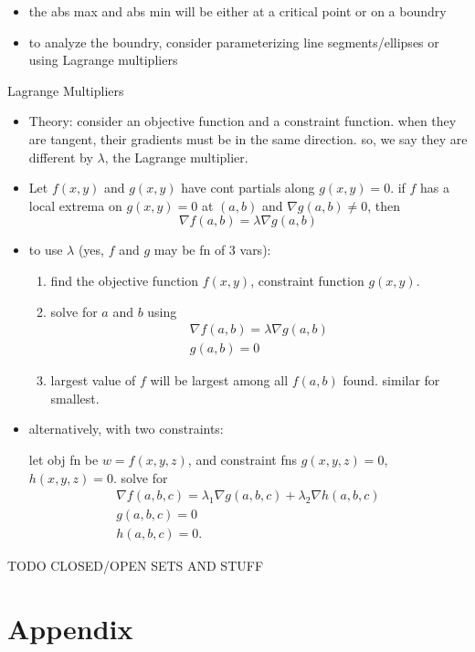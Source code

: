 \documentclass[11pt]{article}
\theoremstyle{definition}
\newcommand{\addsection}[1]{\section*{#1}\addcontentsline{toc}{section}{#1}} %
\newcommand{\col}[1]{\begin{minipage}{\columnwidth}#1\end{minipage}}
\begin{document}
\begin{multicols}{2}
{\begin{itemize}
      a cont function on a closed and bounded set has an abs min and abs max in the set
      \item the abs max and abs min will be either at a critical point or on a boundry
      \item to analyze the boundry, consider parameterizing line segments/ellipses or using Lagrange multipliers
    \end{itemize}
  }
  \col{
    Lagrange Multipliers
    \begin{itemize}
      \item Theory: consider an objective function and a constraint function. when they are tangent, their gradients must be in the same direction. so, we say they are different by $\lambda$, the Lagrange multiplier.
      \item Let $f(x,y)$ and $g(x,y)$ have cont partials along $g(x,y)=0$. if $f$ has a local extrema on $g(x,y)=0$ at $(a,b)$ and $\nabla g(a,b) \ne 0$, then
      \[ \nabla f(a,b) = \lambda \nabla g(a,b) \]
      \item to use $\lambda$ (yes, $f$ and $g$ may be fn of 3 vars):
      \begin{enumerate}
        \item find the objective function $f(x,y)$, constraint function $g(x,y)$.
        \item solve for $a$ and $b$ using
        \begin{gather*}
          \nabla f(a,b) = \lambda\nabla g(a,b) \\
          g(a,b)=0
        \end{gather*}
        \item largest value of $f$ will be largest among all $f(a,b)$ found. similar for smallest.
      \end{enumerate}
      \item alternatively, with two constraints:
      
      let obj fn be $w=f(x,y,z)$, and constraint fns $g(x,y,z)=0$, $h(x,y,z)=0$. solve for
      \begin{gather*}
        \nabla f(a,b,c) = \lambda_1\nabla g(a,b,c) + \lambda_2\nabla h(a,b,c) \\
        g(a,b,c) = 0 \\
        h(a,b,c) = 0.
      \end{gather*}
    \end{itemize}
    TODO CLOSED/OPEN SETS AND STUFF
  }
\end{multicols}

\newpage
\addsection{Appendix} 
\end{document}
